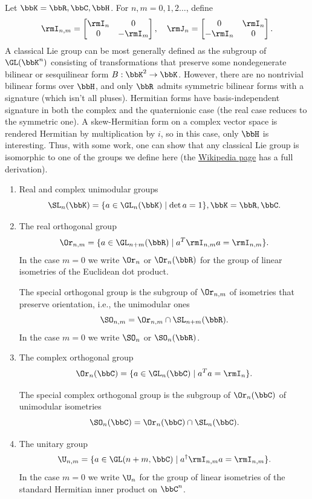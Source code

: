 \begin{example}
    Let $\bbK=\bbR,\bbC,\bbH$. For $n,m=0,1,2\ldots$, define
    \[\rmI_{n,m}=
    \begin{bmatrix}
        \rmI_n&0\\0&-\rmI_m
    \end{bmatrix},\quad \rmJ_n=
    \begin{bmatrix}
        0&\rmI_n\\-\rmI_n&0
    \end{bmatrix}.
    \]
    A classical Lie group can be most generally defined as the subgroup of $\GL(\bbK^n)$ consisting of transformations that preserve some nondegenerate bilinear or sesquilinear form $B:\bbK^2\to \bbK$. However, there are no nontrivial bilinear forms over $\bbH$, and only $\bbR$ admits symmetric bilinear forms with a signature (which isn't all pluses). Hermitian forms have basis-independent signature in both the complex and the quaternionic case (the real case reduces to the symmetric one). A skew-Hermitian form on a complex vector space is rendered Hermitian by multiplication by $i$, so in this case, only $\bbH$ is interesting. Thus, with some work, one can show that any classical Lie group is isomorphic to one of the groups we define here (the \href{https://en.wikipedia.org/wiki/Classical_group}{Wikipedia page} has a full derivation).
    \begin{enumerate}
        \item Real and complex unimodular groups
        \[\SL_n(\bbK)=\{a\in\GL_n(\bbK)\mid \det a=1\}, \bbK=\bbR,\bbC.\]
        \item The real orthogonal group
        \[\Or_{n,m}=\{a\in\GL_{n+m}(\bbR)\mid a^T \rmI_{n,m}a=\rmI_{n,m}\}.\]
        In the case $m=0$ we write $\Or_n$ or $\Or_n(\bbR)$ for the group of linear isometries of the Euclidean dot product.

        The special orthogonal group is the subgroup of $\Or_{n,m}$ of isometries that preserve orientation, i.e., the unimodular ones
        \[\SO_{n,m}=\Or_{n,m}\cap \SL_{n+m}(\bbR).\]
        In the case $m=0$ we write $\SO_n$ or $\SO_n(\bbR)$.
        \item The complex orthogonal group
        \[\Or_{n}(\bbC)=\{a\in\GL_{n}(\bbC)\mid a^T a=\rmI_{n}\}.\]

        The special complex orthogonal group is the subgroup of $\Or_{n}(\bbC)$ of unimodular isometries
        \[\SO_{n}(\bbC)=\Or_{n}(\bbC)\cap \SL_{n}(\bbC).\]
        \item The unitary group
        \[\U_{n,m}=\{a\in \GL(n+m,\bbC)\mid a^\dagger \rmI_{n,m}a=\rmI_{n,m}\}.\]
        In the case $m=0$ we write $\U_n$ for the group of linear isometries of the standard Hermitian inner product on $\bbC^n$.


\end{enumerate}
\end{example}

